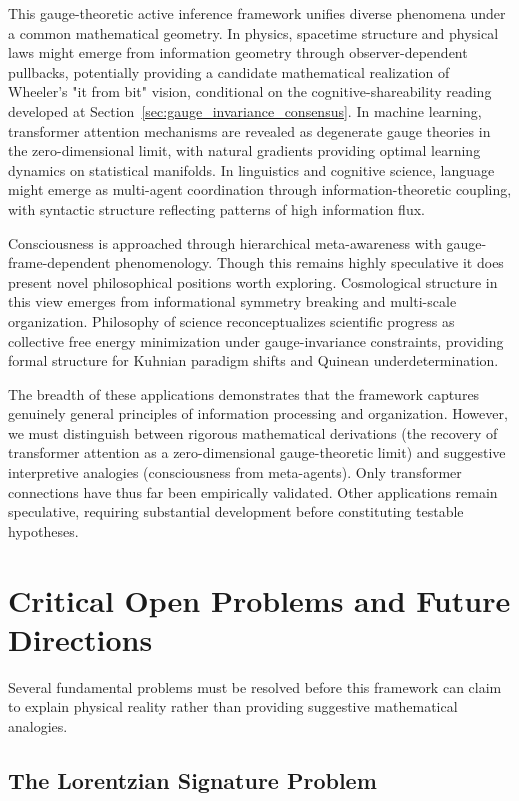 \documentclass[11pt]{article}
\begin{document}
This gauge-theoretic active inference framework unifies diverse phenomena under a common mathematical geometry. In physics, spacetime structure and physical laws might emerge from information geometry through observer-dependent pullbacks, potentially providing a candidate mathematical realization of Wheeler's "it from bit" vision, conditional on the cognitive-shareability reading developed at Section~\ref{sec:gauge_invariance_consensus}. In machine learning, transformer attention mechanisms are revealed as degenerate gauge theories in the zero-dimensional limit, with natural gradients providing optimal learning dynamics on statistical manifolds. In linguistics and cognitive science, language might emerge as multi-agent coordination through information-theoretic coupling, with syntactic structure reflecting patterns of high information flux.

Consciousness is approached through hierarchical meta-awareness with gauge-frame-dependent phenomenology. Though this remains highly speculative it does present novel philosophical positions worth exploring. Cosmological structure in this view emerges from informational symmetry breaking and multi-scale organization. Philosophy of science reconceptualizes scientific progress as collective free energy minimization under gauge-invariance constraints, providing formal structure for Kuhnian paradigm shifts and Quinean underdetermination.

The breadth of these applications demonstrates that the framework captures genuinely general principles of information processing and organization. However, we must distinguish between rigorous mathematical derivations (the recovery of transformer attention as a zero-dimensional gauge-theoretic limit) and suggestive interpretive analogies (consciousness from meta-agents). Only transformer connections have thus far been empirically validated. Other applications remain speculative, requiring substantial development before constituting testable hypotheses.

\section{Critical Open Problems and Future Directions}
\label{sec:open_problems}

Several fundamental problems must be resolved before this framework can claim to explain physical reality rather than providing suggestive mathematical analogies.

\subsection{The Lorentzian Signature Problem}
\end{document}
